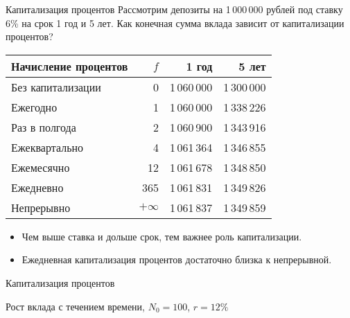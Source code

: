 \documentclass{beamer}
\begin{document}
\begin{frame}{Капитализация процентов}
\justify
Рассмотрим депозиты на 1\,000\,000 рублей под ставку 6\% на срок 1 год и 5 лет. Как конечная сумма вклада зависит от капитализации процентов?


\begin{table}
\centering
\begin{tabular}{l|r|r|r}
Начисление процентов & $f$ & 1 год & 5 лет \\ \hline
Без капитализации & 0         & 1\,060\,000 & 1\,300\,000 \\
Ежегодно          & 1         & 1\,060\,000 & 1\,338\,226 \\
Раз в полгода     & 2         & 1\,060\,900 & 1\,343\,916 \\
Ежеквартально     & 4         & 1\,061\,364 & 1\,346\,855 \\
Ежемесячно        & 12        & 1\,061\,678 & 1\,348\,850 \\
Ежедневно         & 365       & 1\,061\,831 & 1\,349\,826 \\
Непрерывно        & $+\infty$ & 1\,061\,837 & 1\,349\,859
\end{tabular}
\end{table}

\justifying
\vspace{\baselineskip}
\begin{itemize}
\justifying
\item Чем выше ставка и дольше срок, тем важнее роль капитализации.
\item Ежедневная капитализация процентов достаточно близка к непрерывной.
\end{itemize}
\end{frame}



\begin{frame}{Капитализация процентов}

	\centering
	\scriptsize{Рост вклада с течением времени, $N_0=100$, $r=12\%$}
\end{frame}
\end{document}
